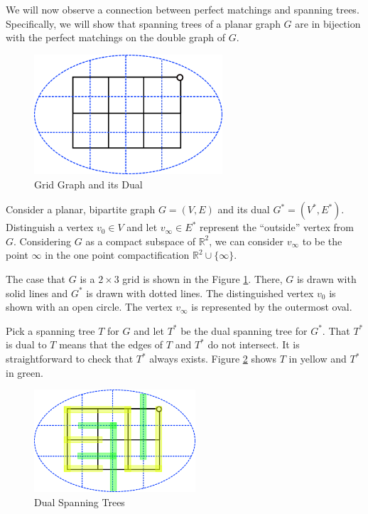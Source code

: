 \documentclass{article}
\begin{document}
\hspace{1cm} We will now observe a connection between perfect matchings and spanning trees. Specifically, we will show that spanning trees of a planar graph $G$ are in bijection with the perfect matchings on the double graph of $G$.

\begin{figure}[htb!]
	\begin{center}
 	\includegraphics[width=7cm]{figures/grid_dual.png}
  	\caption{Grid Graph and its Dual}
	\label{fig:grid}
 	 \end{center}
\end{figure}

Consider a planar, bipartite graph $G = (V,E)$ and its dual $G^* = (V^*, E^*)$. Distinguish a vertex $v_0 \in V$ and let $v_\infty \in E^*$ represent the ``outside'' vertex from $G$. Considering $G$ as a compact subspace of $\mathbb{R}^2$, we can consider $v_\infty$ to be the point $\infty$ in the one point compactification $\mathbb{R}^2 \cup \{\infty\}$. 

The case that $G$ is a $2 \times 3$ grid is shown in the Figure \ref{fig:grid}. There, $G$ is drawn with solid lines and $G^*$ is drawn with dotted lines. The distinguished vertex $v_0$ is shown with an open circle. The vertex $v_\infty$ is represented by the outermost oval. 



Pick a spanning tree $T$ for $G$ and let $T^*$ be the dual spanning tree for $G^*$. That $T^*$ is dual to $T$ means that the edges of $T$ and $T^*$ do not intersect. It is straightforward to check that $T^*$ always exists. Figure \ref{fig:dualspan} shows $T$ in yellow and $T^*$ in green. 
\begin{figure}[htb!]
	\begin{center}
 	\includegraphics[width=6cm]{figures/grid_dual_trees.png}
  	\caption{Dual Spanning Trees}
	 \label{fig:dualspan}
 	 \end{center}
\end{figure}
\end{document}
